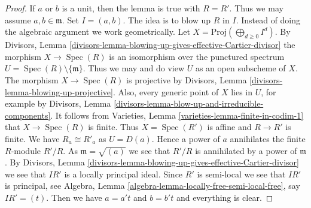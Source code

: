 \documentclass[10pt,a4paper]{amsart}
\theoremstyle{plain}
\theoremstyle{definition}
\theoremstyle{remark}
\numberwithin{equation}{subsection}
\def\Spec{\mathop{\mathrm{Spec}}}
\begin{document}
\begin{proof}
If $a$ or $b$ is a unit, then the lemma is true with $R = R'$.
Thus we may assume $a, b \in \mathfrak m$.
Set $I = (a, b)$. The idea is to blow up $R$ in $I$.
Instead of doing the algebraic argument we work geometrically.
Let $X = \text{Proj}(\bigoplus_{d \geq 0} I^d)$.
By Divisors, Lemma
\ref{divisors-lemma-blowing-up-gives-effective-Cartier-divisor}
the morphism $X \to \Spec(R)$ is an isomorphism over
the punctured spectrum $U = \Spec(R) \setminus \{\mathfrak m\}$.
Thus we may and do view $U$ as an open subscheme of $X$.
The morphism $X \to \Spec(R)$ is projective by
Divisors, Lemma \ref{divisors-lemma-blowing-up-projective}.
Also, every generic point of $X$ lies in $U$, for example
by Divisors, Lemma \ref{divisors-lemma-blow-up-and-irreducible-components}.
It follows from Varieties, Lemma \ref{varieties-lemma-finite-in-codim-1}
that $X \to \Spec(R)$ is finite. Thus $X = \Spec(R')$ is
affine and $R \to R'$ is finite. We have $R_a \cong R'_a$ as $U = D(a)$.
Hence a power of $a$ annihilates the finite $R$-module $R'/R$.
As $\mathfrak m = \sqrt{(a)}$ we see that $R'/R$ is annihilated
by a power of $\mathfrak m$. By
Divisors, Lemma \ref{divisors-lemma-blowing-up-gives-effective-Cartier-divisor}
we see that $IR'$ is a locally principal ideal.
Since $R'$ is semi-local we see that $IR'$ is principal,
see Algebra, Lemma \ref{algebra-lemma-locally-free-semi-local-free},
say $IR' = (t)$. Then we have $a = a't$ and $b = b't$ and everything is
clear.
\end{proof}
\end{document}
